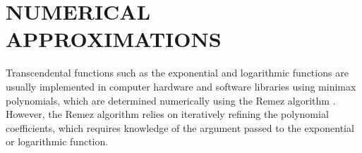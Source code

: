 

\chapter{NUMERICAL APPROXIMATIONS}
Transcendental functions such as the exponential and logarithmic functions are usually implemented in computer hardware and software libraries using minimax polynomials, which are determined numerically using the Remez algorithm \cite{harrison_computation_1999}.
However, the Remez algorithm relies on iteratively refining the polynomial coefficients, which requires knowledge of the argument passed to the exponential or logarithmic function.

